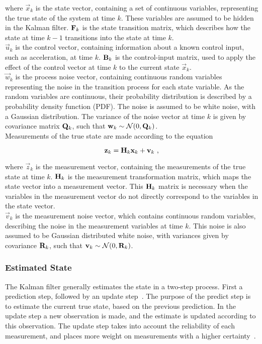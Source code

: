 where $\vec{x}_k$ is the state vector, containing a set of continuous variables, representing the true state of the system at time $k$. These variables are assumed to be hidden in the Kalman filter. $\mathbf{F}_k$ is the state transition matrix, which describes how the state at time $k-1$ transitions into the state at time $k$. \\

$\vec{u}_k$ is the control vector, containing information about a known control input, such as acceleration, at time $k$. $\mathbf{B}_k$ is the control-input matrix, used to apply the effect of the control vector at time $k$ to the current state $\vec{x}_k$. \\

$\vec{w}_k$ is the process noise vector, containing continuous random variables representing the noise in the transition process for each state variable. As the random variables are continuous, their probability distribution is described by a probability density function (PDF). The noise is assumed to be white noise, with a Gaussian distribution. The variance of the noise vector at time $k$ is given by covariance matrix $\mathbf{Q}_k$, such that $\mathbf{w}_k \sim \mathcal{N}(0, \mathbf{Q}_k)$. \\

Measurements of the true state are made according to the equation

\begin{equation}
\label{eq:true_measurement}
  \mathbf{z}_k = \mathbf{H}_k \mathbf{x}_k + \mathbf{v}_k \text{ ,}
\end{equation}

where $\vec{z}_k$ is the measurement vector, containing the measurements of the true state at time $k$. $\mathbf{H}_k$ is the measurement transformation matrix, which maps the state vector into a measurement vector. This $\mathbf{H}_k$ matrix is necessary when the variables in the measurement vector do not directly correspond to the variables in the state vector. \\

$\vec{v}_k$ is the measurement noise vector, which contains continuous random variables, describing the noise in the measurement variables at time $k$. This noise is also assumed to be Gaussian distributed white noise, with variances given by covariance $\mathbf{R}_k$, such that $\mathbf{v}_k \sim \mathcal{N}(0, \mathbf{R}_k)$. \\

\subsubsection{Estimated State}
The Kalman filter generally estimates the state in a two-step process. First a prediction step, followed by an update step~\cite{faragher2012understanding}. The purpose of the predict step is to estimate the current true state, based on the previous prediction. In the update step a new observation is made, and the estimate is updated according to this observation. The update step takes into account the reliability of each measurement, and places more weight on measurements with a higher certainty~\cite{faragher2012understanding}. \\ 

